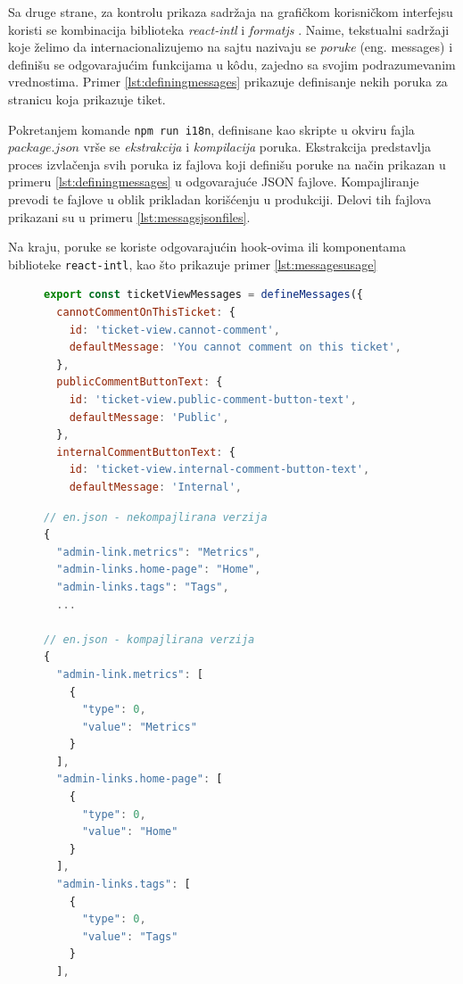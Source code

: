 \documentclass[12pt,oneside]{memoir}
\begin{document}
Sa druge strane, za kontrolu prikaza sadržaja na grafičkom korisničkom interfejsu koristi se kombinacija biblioteka \textit{react-intl} i \textit{formatjs} \cite{formatjsdocs}. Naime, tekstualni sadržaji koje želimo da internacionalizujemo na sajtu nazivaju se \textit{poruke} (eng. messages) i definišu se odgovarajućim funkcijama u k\^{o}du, zajedno sa svojim podrazumevanim vrednostima. Primer \ref{lst:definingmessages} prikazuje definisanje nekih poruka za stranicu koja prikazuje tiket.

Pokretanjem komande \verb|npm run i18n|, definisane kao skripte u okviru fajla $package.json$ vrše se \textit{ekstrakcija} i \textit{kompilacija} poruka. Ekstrakcija predstavlja proces izvlačenja svih poruka iz fajlova koji definišu poruke na način prikazan u primeru \ref{lst:definingmessages} u odgovarajuće JSON fajlove. Kompajliranje prevodi te fajlove u oblik prikladan korišćenju u produkciji. Delovi tih fajlova prikazani su u primeru \ref{lst:messagsjsonfiles}.

Na kraju, poruke se koriste odgovarajućin hook-ovima ili komponentama biblioteke \verb|react-intl|, kao što prikazuje primer \ref{lst:messagesusage}

\begin{figure}[h]
\begin{lstlisting}[language=JavaScript, style=ES6, caption={Definisanje poruka.}, label={lst:definingmessages}]
export const ticketViewMessages = defineMessages({
  cannotCommentOnThisTicket: {
    id: 'ticket-view.cannot-comment',
    defaultMessage: 'You cannot comment on this ticket',
  },
  publicCommentButtonText: {
    id: 'ticket-view.public-comment-button-text',
    defaultMessage: 'Public',
  },
  internalCommentButtonText: {
    id: 'ticket-view.internal-comment-button-text',
    defaultMessage: 'Internal',

\end{lstlisting}
\end{figure}

\begin{figure}[h]
\begin{lstlisting}[language=JavaScript, style=ES6, caption={JSON fajlovi sa porukama.}, label={lst:messagsjsonfiles}]
// en.json - nekompajlirana verzija
{
  "admin-link.metrics": "Metrics",
  "admin-links.home-page": "Home",
  "admin-links.tags": "Tags",
  ...

// en.json - kompajlirana verzija
{
  "admin-link.metrics": [
    {
      "type": 0,
      "value": "Metrics"
    }
  ],
  "admin-links.home-page": [
    {
      "type": 0,
      "value": "Home"
    }
  ],
  "admin-links.tags": [
    {
      "type": 0,
      "value": "Tags"
    }
  ],
\end{lstlisting}
\end{figure}
\end{document}
